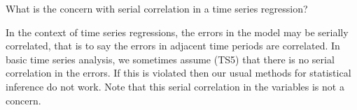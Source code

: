 
\question[2] What is the concern with serial correlation in a time series regression?

\begin{solution}[\halfpage]
  In the context of time series regressions, the errors in the model may be serially correlated, that 
  is to say the errors in adjacent time periods are correlated. In basic time series analysis, we sometimes 
  assume (TS5) that there is no serial correlation in the errors. If this is violated then our usual methods 
  for statistical inference do not work. Note that this serial correlation in the variables is not a concern.
\end{solution}

